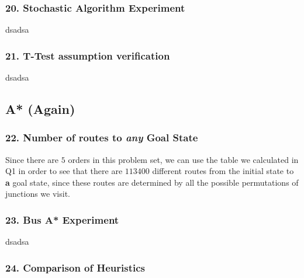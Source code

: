 \documentclass{article}
\begin{document}
\subsubsection*{20. Stochastic Algorithm Experiment}
dsadsa

\subsubsection*{21. T-Test assumption verification}
dsadsa

\subsection*{A* (Again)}
\subsubsection*{22. Number of routes to \emph{any} Goal State}
Since there are $5$ orders in this problem set, we can use the table we calculated in Q1 in order to see that there are $113400$ different routes from the initial state to \textbf{a} goal state, since these routes are determined by all the possible permutations of junctions we visit.

\subsubsection*{23. Bus A* Experiment}
dsadsa

\subsubsection*{24. Comparison of Heuristics}
\end{document}
